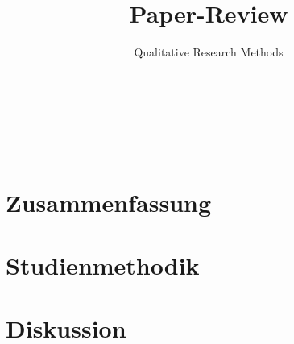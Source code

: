 \documentclass{hsflensburg}
\title{Paper-Review}
\subtitle{Qualitative Research Methods}
\author{
	\name{Tom Hartelt}\\
	\institution{Hochschule Flensburg}
	\and
	\name{Martin Hermannsen}\\
	\institution{Hochschule Flensburg}
	\and
	\name{Michael Frank}\\
	\institution{Hochschule Flensburg}
}
\begin{document}
	\maketitle
 	 \tableofcontents

  \pagebreak
	
	\section{Zusammenfassung}

	\section{Studienmethodik}

	\section{Diskussion}

	\clearpage
	\nocite{*}	
	
	
\end{document}

